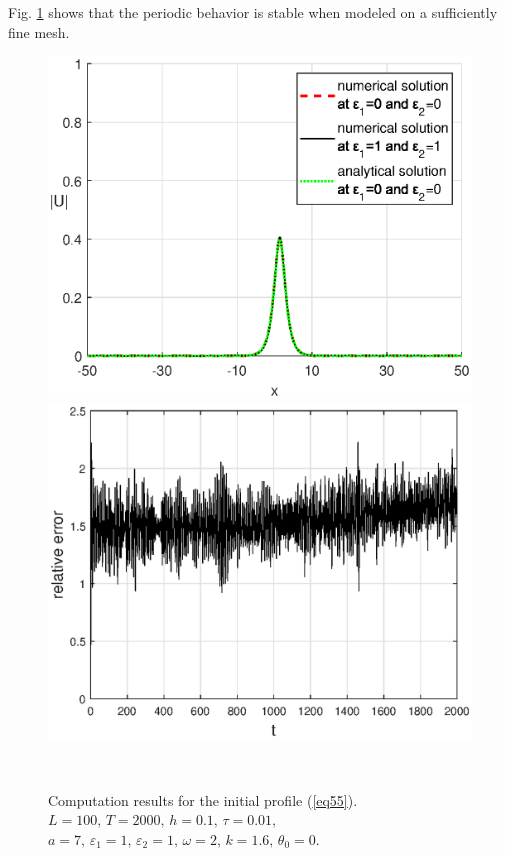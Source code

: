 \documentclass[preprint,12pt]{elsarticle}
\begin{document}
Fig. \ref{fig233} shows that the periodic behavior is stable when modeled on a sufficiently fine mesh.
\begin{figure}[H]%
\begin{center}
\begin{minipage}[h]{0.48\linewidth}
\includegraphics[width=1\linewidth]{fig43.eps}
\end{minipage}
\hfill
\begin{minipage}[h]{0.48\linewidth}
\includegraphics[width=1\linewidth]{fig44.eps}
\end{minipage}\\
\end{center}
\caption{Computation results for the initial profile (\ref{eq55}).\\
\(L=100,\, T=2000,\, h=0.1,\, \tau=0.01,\) \\
\(a=7,\,\varepsilon_{1}=1,\,\varepsilon_{2}=1,\, \omega=2,\, k=1.6,\, \theta_{0}=0\).}
\label{fig233}
\end{figure}
\end{document}
